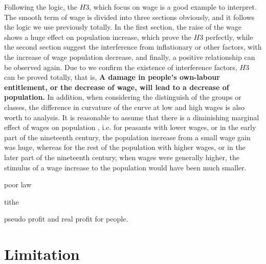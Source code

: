 Following the logic, the $H3$, which focus on wage is a good example to interpret. The smooth term of wage is divided into three sections obviously, and it follows the logic we use previously totally. In the first section, the raise of the wage shows a huge effect on population increase, which prove the $H3$ perfectly, while the second section suggest  the interference from inflationary or other factors, with the increase of wage population decrease, and finally, a positive relationship can be observed again. Due to we confirm the existence of interference factors, $H3$ can be proved totally, that is, \textbf{A damage in people's own-labour entitlement, or the decrease of wage, will lead to a decrease of population.} In addition, when considering the distinguish of the groups or classes, the difference in curvature of the curve at low and high wages is also worth to analysis. It is reasonable to assume that there is a diminishing marginal effect of wages on population \citep{li2012capital}, i.e. for peasants with lower wages, or in the early part of the nineteenth century, the population increase from a small wage gain was huge, whereas for the rest of the population with higher wages, or in the later part of the nineteenth century, when wages were generally higher, the stimulus of a wage increase to the population would have been much smaller.


poor law

tithe

pseudo profit and real profit for people.



\section{Limitation}




